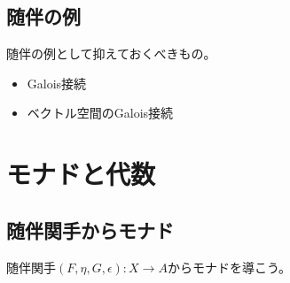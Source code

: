 {\subsection{随伴の例}\label{s2:随伴の例} %
	\begin{todo}[随伴の例]\label{todo:随伴の例} %
		随伴の例として抑えておくべきもの。
		\begin{itemize}\setlength{\itemsep}{-1mm} %
			\item Galois接続
			\item ベクトル空間のGalois接続
		\end{itemize} %
	\end{todo} %
\section{モナドと代数}\label{s1:モナドと代数} %
\subsection{随伴関手からモナド}\label{s2:随伴関手からモナド} %
	随伴関手$(F,\eta,G,\epsilon):X\to A$からモナドを導こう。

}
